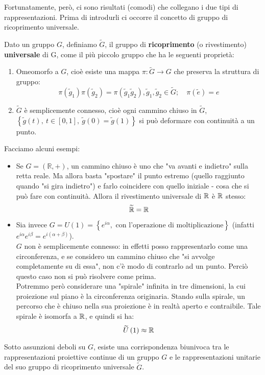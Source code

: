 \documentclass[../../FisicaTeorica.tex]{subfiles}
\begin{document}
Fortunatamente, però, ci sono risultati (comodi) che collegano i due tipi di rappresentazioni. Prima di introdurli ci occorre il concetto di gruppo di ricoprimento universale.
\begin{dfn}
Dato un gruppo $G$, definiamo $\widetilde{G}$, il gruppo di \textbf{ricoprimento} (o rivestimento) \textbf{universale} di G, come il più piccolo gruppo che ha le seguenti proprietà:
\begin{enumerate}
    \item Omeomorfo a $G$, cioè esiste una mappa $\pi :\widetilde{G}\to G$ che preserva la struttura di gruppo:
    \[
	\pi \left({\widetilde{g}}_1\right)\pi \left({\widetilde{g}}_2\right)=\pi \left({\widetilde{g}}_1{\widetilde{g}}_2\right), {\widetilde{g}}_1,{\widetilde{g}}_2\in \widetilde{G}; \quad
	\pi \left(\widetilde{e}\right)=e
	\]
	\item $\widetilde{G}$ è semplicemente connesso, cioè ogni cammino chiuso in $\widetilde{G}$, $\left\{\widetilde{g}\left(t\right),\ t\in\left[0,1\right],\ \widetilde{g}\left(0\right)=\widetilde{g}(1)\right\}$ si può deformare con continuità a un punto.
\end{enumerate}
\end{dfn}
Facciamo alcuni esempi: %
\begin{itemize}
\item Se $G=\left(\mathbb{R},+\right)$, un cammino chiuso è uno che "va avanti e indietro" sulla retta reale. Ma allora basta "spostare" il punto estremo (quello raggiunto quando "si gira indietro") e farlo coincidere con quello iniziale - cosa che si può fare con continuità. Allora il rivestimento universale di $\mathbb{R}$ è $\mathbb{R}$ stesso:
\[
\widetilde{\mathbb{R}}=\mathbb{R}
\]
\item Sia invece $G=U\left(1\right)= \left\{e^{i\alpha},\text{ con l'operazione di moltiplicazione}\right\}$ (infatti $e^{i\alpha}e^{i\beta}=e^{i\left(\alpha+\beta\right)}$).\\
$G$ non è semplicemente connesso: in effetti posso rappresentarlo come una circonferenza, e se considero un cammino chiuso che "si avvolge completamente su di essa", non c'è modo di contrarlo ad un punto. Perciò questo caso non si può risolvere come prima.\\
Potremmo però considerare una "spirale" infinita in tre dimensioni, la cui proiezione sul piano è la circonferenza originaria. Stando sulla spirale, un percorso che è chiuso nella sua proiezione è in realtà aperto e contraibile. Tale spirale è isomorfa a $\mathbb{R}$, e quindi si ha:
\[\widetilde{U}\left(1\right)\approx \mathbb{R}
\]
\end{itemize}
\begin{thm}
Sotto assunzioni deboli su $G$, esiste una corrispondenza biunivoca tra le rappresentazioni proiettive continue di un gruppo $G$ e le rappresentazioni unitarie del suo gruppo di ricoprimento universale $\widetilde{G}$.
\end{thm}
\end{document}
